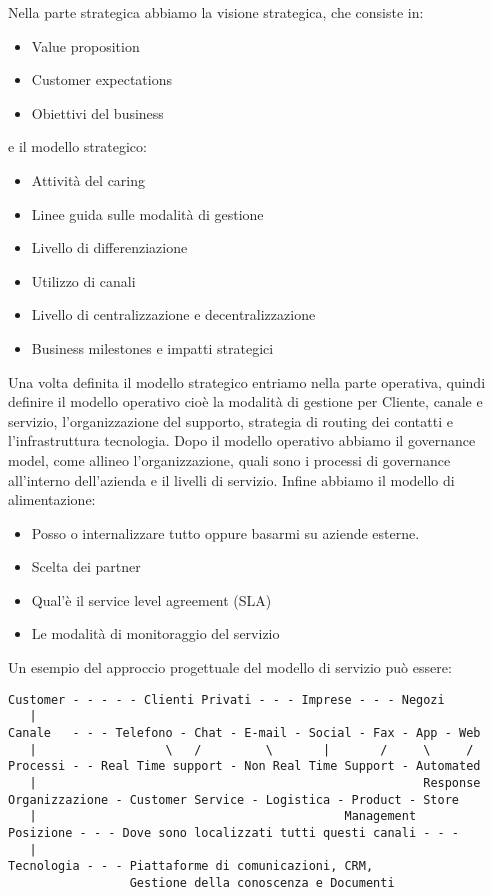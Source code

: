 \documentclass[11pt]{article}
\begin{document}
Nella parte strategica abbiamo la visione strategica, che consiste in:
\begin{itemize}[noitemsep,topsep=0ex]
	\item Value proposition
	\item Customer expectations
	\item Obiettivi del business
\end{itemize}
e il modello strategico:
\begin{itemize}[noitemsep,topsep=0ex]
	\item Attività del caring
	\item Linee guida sulle modalità di gestione
	\item Livello di differenziazione
	\item Utilizzo di canali
	\item Livello di centralizzazione e decentralizzazione
	\item Business milestones e impatti strategici
\end{itemize}
Una volta definita il modello strategico entriamo nella parte operativa, quindi definire il modello operativo cioè la modalità di gestione per Cliente, canale e servizio, l'organizzazione del supporto, strategia di routing dei contatti e l'infrastruttura tecnologia. 
Dopo il modello operativo abbiamo il governance model, come allineo l'organizzazione, quali sono i processi di governance all'interno dell'azienda e il livelli di servizio.
Infine abbiamo il modello di alimentazione:
\begin{itemize}[noitemsep,topsep=0ex]
	\item Posso o internalizzare tutto oppure basarmi su aziende esterne.
	\item Scelta dei partner
	\item Qual'è il service level agreement (SLA)
	\item Le modalità di monitoraggio del servizio
\end{itemize} 
Un esempio del approccio progettuale del modello di servizio può essere:
\begin{verbatim}
Customer - - - - - Clienti Privati - - - Imprese - - - Negozi
   |
Canale   - - - Telefono - Chat - E-mail - Social - Fax - App - Web
   |                  \   /         \       |       /     \     /
Processi - - Real Time support - Non Real Time Support - Automated
   |                                                      Response
Organizzazione - Customer Service - Logistica - Product - Store
   |                                           Management
Posizione - - - Dove sono localizzati tutti questi canali - - -
   |
Tecnologia - - - Piattaforme di comunicazioni, CRM,
                 Gestione della conoscenza e Documenti
\end{verbatim}
\end{document}
